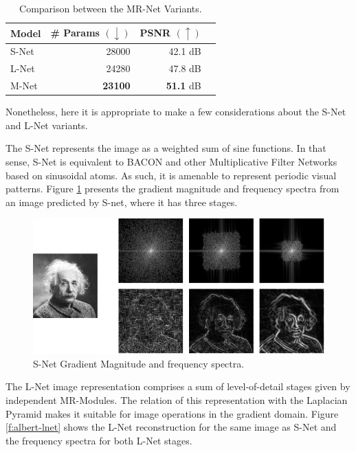\begin{table}[!h]
\centering
\small
\begin{tabular}{|l|r|r|r|}
\hline
Model & \# Params $(\downarrow)$ & PSNR $(\uparrow)$  \\
\hline
S-Net & 28000 & 42.1 dB  \\
L-Net & 24280 & 47.8 dB \\
M-Net & {\bf 23100} & {\bf 51.1} dB   \\
\hline
\end{tabular}
\vspace{-0.3cm}
\caption{\label{tab:comp-variants} Comparison between the MR-Net Variants.}
\label{t:comp_variantes}
\end{table}

Nonetheless, here it is appropriate to make a few considerations about the S-Net and L-Net variants.

The S-Net represents the image as a weighted sum of sine functions. In that sense, S-Net is equivalent to BACON and other Multiplicative Filter Networks based on sinusoidal atoms. As such, it is amenable to represent periodic visual patterns. Figure \ref{f:albert-snet} presents the gradient magnitude and frequency spectra from an image predicted by S-net, where it has three stages.

\begin{figure}[!h]
\centering
\includegraphics[width=0.9\linewidth]{img/ch5/albert.png}
\caption{S-Net Gradient Magnitude and frequency spectra.}
\label{f:albert-snet}
\end{figure}


The L-Net image representation comprises a sum of level-of-detail stages given by independent MR-Modules. The relation of this representation with the Laplacian Pyramid makes it suitable for image operations in the gradient domain. Figure \ref{f:albert-lnet} shows the L-Net reconstruction for the same image as S-Net and the frequency spectra for both L-Net stages. 

